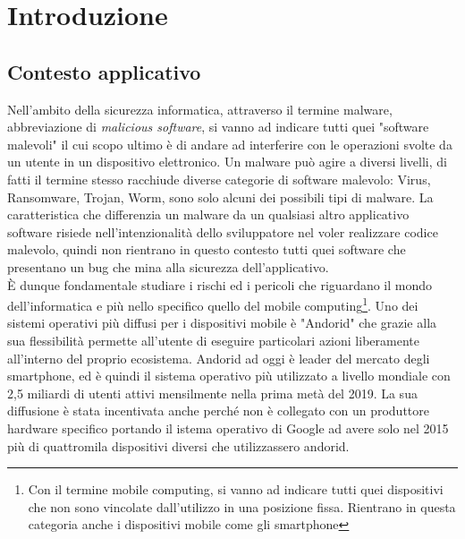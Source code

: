 \mainmatter %
\chapter{Introduzione}
\label{chap:Introduzione}


\section{Contesto applicativo}
\label{sec:intro1}
Nell'ambito della sicurezza informatica, attraverso il termine malware, abbreviazione di \textit{malicious software}, si vanno ad indicare tutti quei "software malevoli" il cui scopo ultimo è di andare ad interferire con le operazioni svolte da un utente in un dispositivo elettronico. Un malware può agire a diversi livelli, di fatti il termine stesso racchiude diverse categorie di software malevolo: Virus, Ransomware, Trojan, Worm, sono solo alcuni dei possibili tipi di malware. La caratteristica che differenzia un malware da un qualsiasi altro applicativo software risiede nell'intenzionalità dello sviluppatore nel voler realizzare codice malevolo, quindi non rientrano in questo contesto tutti quei software che presentano un bug che mina alla sicurezza dell'applicativo. 
\\È dunque fondamentale studiare i rischi ed i pericoli che riguardano il mondo dell'informatica e più nello specifico quello del mobile computing\footnote{Con il termine mobile computing, si vanno ad indicare tutti quei dispositivi che non sono vincolate dall'utilizzo in una posizione fissa. Rientrano in questa categoria anche i dispositivi mobile come gli smartphone}. Uno dei sistemi operativi più diffusi per i dispositivi mobile è "Andorid" che grazie alla sua flessibilità permette all'utente di eseguire particolari azioni liberamente all'interno del proprio ecosistema. Andorid  ad oggi è leader del mercato degli smartphone, ed è quindi il sistema operativo più utilizzato a livello mondiale con 2,5 miliardi di utenti attivi mensilmente nella prima metà del 2019\cite{venturebeat}. La sua diffusione è stata incentivata anche perché non è collegato con un produttore hardware specifico portando il istema operativo di Google ad avere solo nel 2015 più di quattromila dispositivi diversi che utilizzassero andorid\cite{4000}. 





